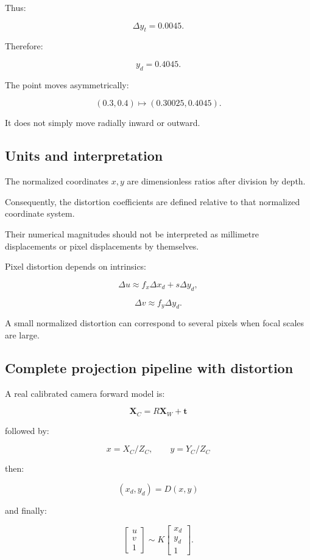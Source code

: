 Thus:

\[
 \boxed{ \Delta y_t=0.0045 }.
\]

Therefore:

\[
 \boxed{y_d=0.4045}.
\]

The point moves asymmetrically:

\[
 (0.3,0.4)\mapsto(0.30025,0.4045).
\]

It does not simply move radially inward or outward.

\subsection{Units and interpretation}\label{02-foundations-ii-ch035-units-and-interpretation}

The normalized coordinates \(x,y\) are dimensionless ratios after division by depth.

Consequently, the distortion coefficients are defined relative to that normalized coordinate system.

Their numerical magnitudes should not be interpreted as millimetre displacements or pixel displacements by themselves.

Pixel distortion depends on intrinsics:

\[
 \Delta u\approx f_x\Delta x_d+s\Delta y_d,
\]

\[
 \Delta v\approx f_y\Delta y_d.
\]

A small normalized distortion can correspond to several pixels when focal scales are large.

\subsection{Complete projection pipeline with distortion}\label{02-foundations-ii-ch035-complete-projection-pipeline-with-distortion}

A real calibrated camera forward model is:

\[
 \boxed{ \mathbf X_C=R\mathbf X_W+\mathbf t }
\]

followed by:

\[
 \boxed{ x=X_C/Z_C,\qquad y=Y_C/Z_C }
\]

then:

\[
 \boxed{ (x_d,y_d)=D(x,y) }
\]

and finally:

\[
 \boxed{ \begin{bmatrix}u\\v\\1\end{bmatrix} \sim K \begin{bmatrix}x_d\\y_d\\1\end{bmatrix} }.
\]

